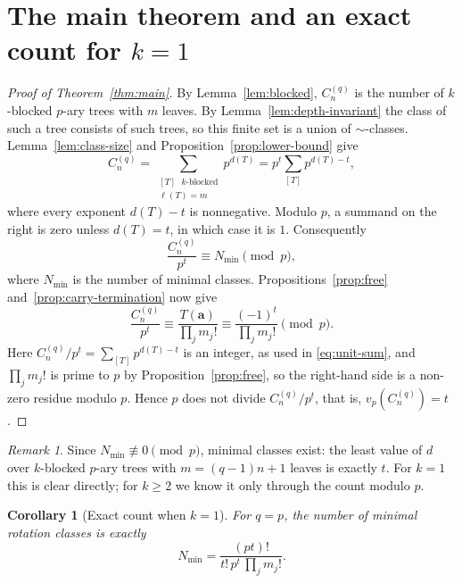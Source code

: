 \documentclass[11pt]{amsart}
\newtheorem{corollary}[theorem]{Corollary}
\theoremstyle{definition}
\theoremstyle{remark}
\newtheorem{remark}[theorem]{Remark}
\newcommand{\fc}{C_n^{(q)}}
\begin{document}
\section{The main theorem and an exact count for \texorpdfstring{$k=1$}{k=1}}
\begin{proof}[Proof of Theorem~\ref{thm:main}]
By Lemma~\ref{lem:blocked}, $\fc$ is the number of $k$-blocked $p$-ary trees with $m$ leaves.  By Lemma~\ref{lem:depth-invariant} the class of such a tree consists of such trees, so this finite set is a union of $\sim$-classes.  Lemma~\ref{lem:class-size} and Proposition~\ref{prop:lower-bound} give
\[
 \fc=\sum_{\substack{[T]\text{ $k$-blocked}\\\ell(T)=m}}p^{d(T)}
 =p^t\sum_{[T]}p^{d(T)-t},
\]
where every exponent $d(T)-t$ is nonnegative.  Modulo $p$, a summand on the right is zero unless $d(T)=t$, in which case it is $1$.  Consequently
\begin{equation}\label{eq:unit-sum}
 \frac{\fc}{p^t}\equiv N_{\min}\pmod p,
\end{equation}
where $N_{\min}$ is the number of minimal classes.  Propositions~\ref{prop:free} and~\ref{prop:carry-termination} now give
\[
 \frac{\fc}{p^t}\equiv\frac{T(\mathbf a)}{\prod_jm_j!}
 \equiv\frac{(-1)^t}{\prod_jm_j!}\pmod p.
\]
Here $\fc/p^t=\sum_{[T]}p^{d(T)-t}$ is an integer, as used in \eqref{eq:unit-sum}, and $\prod_jm_j!$ is prime to $p$ by Proposition~\ref{prop:free}, so the right-hand side is a non-zero residue modulo $p$.  Hence $p$ does not divide $\fc/p^t$, that is, $v_p(\fc)=t$.
\end{proof}
\begin{remark}
Since $N_{\min}\not\equiv0\pmod p$, minimal classes exist: the least value of $d$ over $k$-blocked $p$-ary trees with $m=(q-1)n+1$ leaves is exactly $t$.  For $k=1$ this is clear directly; for $k\ge2$ we know it only through the count modulo $p$.
\end{remark}
\begin{corollary}[Exact count when $k=1$]\label{cor:exact-count}
For $q=p$, the number of minimal rotation classes is exactly
\[
 N_{\min}=\frac{(pt)!}{t!\,p^t\,\prod_jm_j!}.
\]
\end{corollary}
\end{document}
